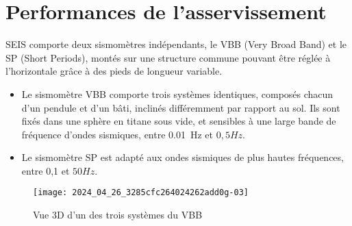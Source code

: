 %
%

\section{Performances de l'asservissement}

SEIS comporte deux sismomètres indépendants, le VBB (Very Broad Band) et le SP (Short Periods), montés sur une structure commune pouvant être réglée à l'horizontale grâce à des pieds de longueur variable.

\begin{itemize}
  \item Le sismomètre VBB comporte trois systèmes identiques, composés chacun d'un pendule et d'un bâti, inclinés différemment par rapport au sol. Ils sont fixés dans une sphère en titane sous vide, et sensibles à une large bande de fréquence d'ondes sismiques, entre \SI{0,01}{Hz} et $0,5 \si{Hz}$.
  \item Le sismomètre SP est adapté aux ondes sismiques de plus hautes fréquences, entre 0,1 et $50 \si{Hz}$.
\end{itemize}

\begin{figure}[!h]
\centering
\texttt{[image: 2024\_04\_26\_3285cfc264024262add0g-03]}
\caption{\label{ccmp2023_fig_02} Vue 3D d'un des trois systèmes du VBB}
\end{figure}


